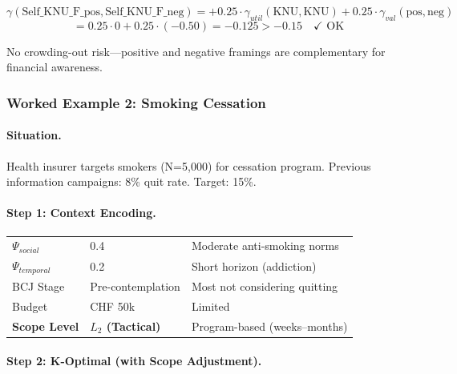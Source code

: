 \begin{equation}
\gamma(\text{Self\_KNU\_F\_pos}, \text{Self\_KNU\_F\_neg}) = +0.25 \cdot \gamma_{util}(\text{KNU}, \text{KNU}) + 0.25 \cdot \gamma_{val}(\text{pos}, \text{neg})
\end{equation}
\begin{equation}
= 0.25 \cdot 0 + 0.25 \cdot (-0.50) = -0.125 > -0.15 \quad \checkmark \text{ OK}
\end{equation}

No crowding-out risk---positive and negative framings are complementary for financial awareness.


\subsubsection{Worked Example 2: Smoking Cessation}
\label{subsubsec:example-smoking}

\paragraph{Situation.} Health insurer targets smokers (N=5,000) for cessation program. Previous information campaigns: 8\% quit rate. Target: 15\%.

\paragraph{Step 1: Context Encoding.}

\begin{center}
\begin{tabular}{@{}lll@{}}
\toprule
$\Psi_{social}$ & 0.4 & Moderate anti-smoking norms \\
$\Psi_{temporal}$ & 0.2 & Short horizon (addiction) \\
BCJ Stage & Pre-contemplation & Most not considering quitting \\
Budget & CHF 50k & Limited \\
\textbf{Scope Level} & \textbf{$L_2$ (Tactical)} & Program-based (weeks--months) \\
\bottomrule
\end{tabular}
\end{center}

\paragraph{Step 2: K-Optimal (with Scope Adjustment).}

